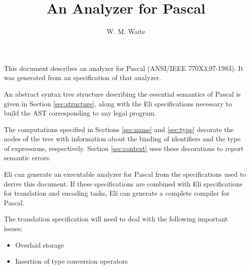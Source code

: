 \title{An Analyzer for Pascal}
\author{W. M. Waite}
\maketitle

This document describes an analyzer for Pascal (ANSI/IEEE 770X3.97-1983).
It was generated from an
specification of that analyzer.

An abstract syntax tree structure describing the essential semantics
of Pascal is given in Section \ref{sec:structure},
along with the Eli specifications necessary to build the AST corresponding
to any legal program.

The computations specified in Sections \ref{sec:name} and \ref{sec:type}
decorate the nodes of the tree with information about
the binding of identifiers and the type of expressions, respectively.
Section \ref{sec:context} uses these decorations to report semantic errors.

Eli can generate an executable analyzer for Pascal from the
specifications used to derive this document.
If these specifications are combined with Eli specifications for
translation and encoding tasks, Eli can generate a complete compiler for
Pascal.

The translation specification will need to deal with the following
important issues:

\begin{itemize}
\item Overlaid storage
\item Insertion of type conversion operators
\end{itemize}

\newpage

\tableofcontents

